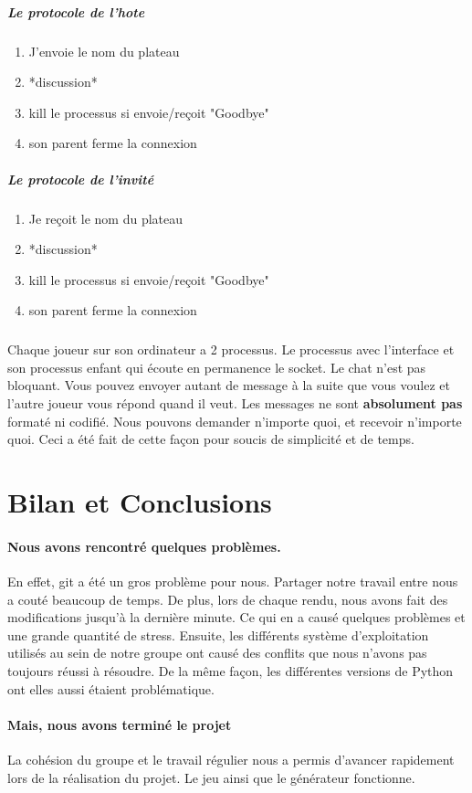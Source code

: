 \documentclass[a4paper]{article}
\begin{document}
 \subparagraph*{Le protocole de l'hote}
 \begin{enumerate}
  \item J'envoie le nom du plateau
  \item *discussion*
  \item kill le processus si envoie/reçoit "Goodbye"
  \item son parent ferme la connexion
 \end{enumerate}
 \subparagraph*{Le protocole de l'invité}
 \begin{enumerate}
  \item Je reçoit le nom du plateau
  \item *discussion*
  \item kill le processus si envoie/reçoit "Goodbye"
  \item son parent ferme la connexion
 \end{enumerate}
 \subparagraph*{}
 Chaque joueur sur son ordinateur a 2 processus. Le processus avec l'interface et son processus enfant qui écoute en permanence le socket.
Le chat n'est pas bloquant. Vous pouvez envoyer autant de message à la suite que vous voulez et l'autre joueur vous répond quand il veut. Les messages ne sont \textbf{absolument pas} formaté ni codifié. Nous pouvons demander n'importe quoi, et recevoir n'importe quoi. Ceci a été fait de cette façon pour soucis de simplicité et de temps.

 \clearpage
 \section{Bilan et Conclusions}

 \paragraph{Nous avons rencontré quelques problèmes.}
 En effet, git a été un gros problème pour nous. Partager notre travail entre nous a couté beaucoup de temps. De plus, lors de chaque rendu, nous avons fait des modifications jusqu'à la dernière minute. Ce qui en a causé quelques problèmes et une grande quantité de stress.
 Ensuite, les différents système d'exploitation utilisés au sein de notre groupe ont causé des conflits que nous n'avons pas toujours réussi à résoudre.
 De la même façon, les différentes versions de Python ont elles aussi étaient problématique.
 
 \paragraph{Mais, nous avons terminé le projet}
 La cohésion du groupe et le travail régulier nous a permis d'avancer rapidement lors de la réalisation du projet.
 Le jeu ainsi que le générateur fonctionne.
 
 
\end{document}
